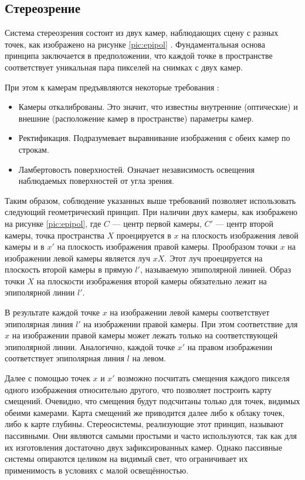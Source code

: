 
\subsection{Стереозрение}
\label{stereovision}
Система стереозрения состоит из двух камер, наблюдающих сцену с разных точек, как изображено на рисунке \ref{pic:epipol} \cite{Hartley2004}. 
Фундаментальная основа принципа заключается в предположении, что каждой точке в пространстве соответствует уникальная пара пикселей на снимках с двух камер.  

При этом к камерам предъявляются некоторые требования \cite{rusoverview}:   %
\begin{itemize}
	\item Камеры откалиброваны. Это значит, что известны внутренние (оптические) и внешние (расположение камер в пространстве) параметры камер. 
	\item Ректификация. Подразумевает выравнивание изображения с обеих камер по строкам.  %
	\item Ламбертовость поверхностей. Означает независимость освещения наблюдаемых поверхностей от угла зрения. 
\end{itemize}

Таким образом, соблюдение указанных выше требований позволяет использовать следующий геометрический принцип. При наличии двух камеры, как изображено 
на рисунке \ref{pic:epipol}, где $C$ — центр первой камеры, $C'$ — центр второй камеры, точка пространства $X$  
проецируется в $x$ на плоскость изображения левой камеры и в $x'$ на плоскость изображения правой камеры. Прообразом точки $x$ на изображении левой 
камеры является луч $xX$. Этот луч проецируется на плоскость второй камеры в прямую $l'$, называемую эпиполярной линией. Образ точки $X$ на плоскости 
изображения второй камеры обязательно лежит на эпиполярной линии $l'$.


В результате каждой точке $x$ на изображении левой камеры соответствует эпиполярная линия $l'$ на изображении правой камеры. При этом соответствие для $x$ на 
изображении правой камеры может лежать только на соответствующей эпиполярной линии. Аналогично, каждой точке $x'$ на правом изображении соответствует 
эпиполярная линия $l$ на левом. 


Далее с помощью точек $x$ и $x'$ возможно посчитать смещения каждого пикселя одного изображения относительно другого, что позволяет построить карту смещений. 
Очевидно, что смещения будут подсчитаны только для точек, видимых обеими камерами. Карта смещений же приводится далее либо к облаку точек, либо к карте глубины. 
Стереосистемы, реализующие этот принцип, называют пассивными. Они являются самыми простыми и часто используются, так как для их изготовления достаточно 
двух зафиксированных камер. Однако пассивные системы опираются целиком на видимый свет, что ограничивает их применимость в условиях с малой освещённостью. %

